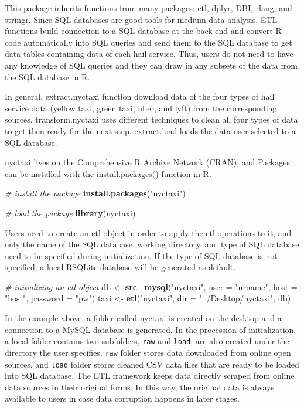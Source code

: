 \documentclass[12pt,twoside]{reedthesis}
\newenvironment{Shaded}{\begin{snugshade}}{\end{snugshade}}
\newcommand{\KeywordTok}[1]{\textcolor[rgb]{0.13,0.29,0.53}{\textbf{#1}}}
\newcommand{\DataTypeTok}[1]{\textcolor[rgb]{0.13,0.29,0.53}{#1}}
\newcommand{\StringTok}[1]{\textcolor[rgb]{0.31,0.60,0.02}{#1}}
\newcommand{\CommentTok}[1]{\textcolor[rgb]{0.56,0.35,0.01}{\textit{#1}}}
\newcommand{\NormalTok}[1]{#1}
\theoremstyle{definition}
\theoremstyle{definition}
\theoremstyle{definition}
\theoremstyle{remark}
\begin{document}
This package inherits functions from many packages: etl, dplyr, DBI,
rlang, and stringr. Since SQL databases are good tools for medium data
analysis, ETL functions build connection to a SQL database at the back
end and convert R code automatically into SQL queries and send them to
the SQL database to get data tables containing data of each hail
service. Thus, users do not need to have any knowledge of SQL queries
and they can draw in any subsets of the data from the SQL database in R.

In general, extract.nyctaxi function download data of the four types of
hail service data (yellow taxi, green taxi, uber, and lyft) from the
corresponding sources. transform.nyctaxi uses different techniques to
clean all four types of data to get then ready for the next step.
extract.load loads the data user selected to a SQL database.

nyctaxi lives on the Comprehensive R Archive Network (CRAN), and
Packages can be installed with the install.packages() function in R.
\begin{Shaded}
\begin{Highlighting}[]
\CommentTok{# install the package}
\KeywordTok{install.packages}\NormalTok{(}\StringTok{"nyctaxi"}\NormalTok{)}

\CommentTok{# load the package}
\KeywordTok{library}\NormalTok{(nyctaxi)}
\end{Highlighting}
\end{Shaded}
Users need to create an etl object in order to apply the etl operations
to it, and only the name of the SQL database, working directory, and
type of SQL database need to be specified during initialization. If the
type of SQL database is not specified, a local RSQLite database will be
generated as default.
\begin{Shaded}
\begin{Highlighting}[]
\CommentTok{# initializing an etl object}
\NormalTok{db <-}\StringTok{ }\KeywordTok{src_mysql}\NormalTok{(}\StringTok{"nyctaxi"}\NormalTok{, }\DataTypeTok{user =} \StringTok{"urname"}\NormalTok{, }\DataTypeTok{host =} \StringTok{"host"}\NormalTok{, }\DataTypeTok{password =} \StringTok{"pw"}\NormalTok{)}
\NormalTok{taxi <-}\StringTok{ }\KeywordTok{etl}\NormalTok{(}\StringTok{"nyctaxi"}\NormalTok{, }\DataTypeTok{dir =} \StringTok{"~/Desktop/nyctaxi"}\NormalTok{, db)}
\end{Highlighting}
\end{Shaded}
In the example above, a folder called nyctaxi is created on the desktop
and a connection to a MySQL database is generated. In the procession of
initialization, a local folder contains two subfolders, \texttt{raw} and
\texttt{load}, are also created under the directory the user specifies.
\texttt{raw} folder stores data downloaded from online open sources, and
\texttt{load} folder stores cleaned CSV data files that are ready to be
loaded into SQL database. The ETL framework keeps data directly scraped
from online data sources in their original forms. In this way, the
original data is always available to users in case data corruption
happens in later stages.
\end{document}
